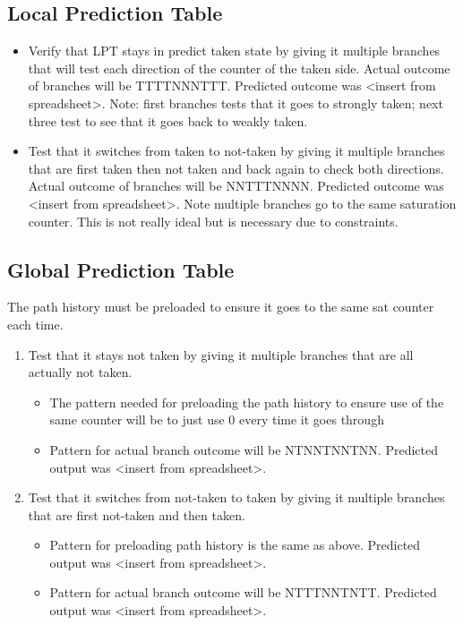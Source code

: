 \documentclass[]{report}   %
\begin{document}
\subsection{Local Prediction Table}
\begin{itemize}
  \item{Verify that LPT stays in predict taken state by giving it multiple branches that will test each direction of the counter of the taken side. Actual outcome of branches will be TTTTNNNTTT. Predicted outcome was <insert from spreadsheet>. Note: first branches tests that it goes to strongly taken; next three test to see that it goes back to weakly taken.}

  \item{Test that it switches from taken to not-taken by giving it multiple branches that
    are first taken then not taken and back again to check both directions. Actual outcome of branches will be NNTTTNNNN. Predicted outcome was <insert from spreadsheet>. Note multiple branches go to the same saturation counter. This is not really ideal but is necessary due to constraints.}
\end{itemize}

\subsection{Global Prediction Table}
The path history must be preloaded to ensure it goes to the same sat counter each time.

\begin{enumerate}
  \item{Test that it stays not taken by giving it multiple branches that are all actually not taken.}

    \begin{itemize}
      \item{The pattern needed for preloading the path history to ensure use of the same counter will be to just use 0 every time it goes through}
      \item{Pattern for actual branch outcome will be NTNNTNNTNN. Predicted output was <insert from spreadsheet>.}
    \end{itemize}
  \item{Test that it switches from not-taken to taken by giving it multiple branches that are first not-taken and then taken.}
    \begin{itemize}
      \item{Pattern for preloading path history is the same as above. Predicted output was <insert from spreadsheet>.}
      \item{Pattern for actual branch outcome will be NTTTNNTNTT. Predicted output was <insert from spreadsheet>.}
    \end{itemize}
\end{enumerate}
\end{document}
